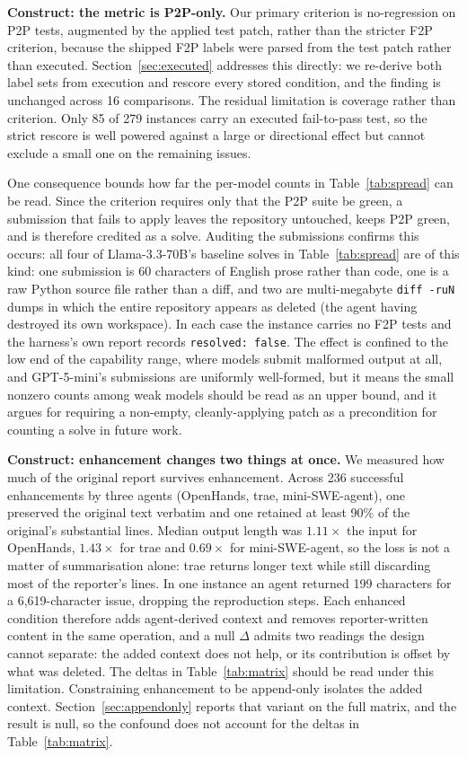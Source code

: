 \documentclass[journal]{IEEEtran}
\begin{document}
\textbf{Construct: the metric is P2P-only.} Our primary criterion is no-regression on P2P tests, augmented by the applied test patch, rather than the stricter F2P criterion, because the shipped F2P labels were parsed from the test patch rather than executed. Section~\ref{sec:executed} addresses this directly: we re-derive both label sets from execution and rescore every stored condition, and the finding is unchanged across 16 comparisons. The residual limitation is coverage rather than criterion. Only 85 of 279 instances carry an executed fail-to-pass test, so the strict rescore is well powered against a large or directional effect but cannot exclude a small one on the remaining issues.

One consequence bounds how far the per-model counts in Table~\ref{tab:spread} can be read. Since the criterion requires only that the P2P suite be green, a submission that fails to apply leaves the repository untouched, keeps P2P green, and is therefore credited as a solve. Auditing the submissions confirms this occurs: all four of Llama-3.3-70B's baseline solves in Table~\ref{tab:spread} are of this kind: one submission is 60 characters of English prose rather than code, one is a raw Python source file rather than a diff, and two are multi-megabyte \texttt{diff -ruN} dumps in which the entire repository appears as deleted (the agent having destroyed its own workspace). In each case the instance carries no F2P tests and the harness's own report records \texttt{resolved: false}. The effect is confined to the low end of the capability range, where models submit malformed output at all, and GPT-5-mini's submissions are uniformly well-formed, but it means the small nonzero counts among weak models should be read as an upper bound, and it argues for requiring a non-empty, cleanly-applying patch as a precondition for counting a solve in future work.

\textbf{Construct: enhancement changes two things at once.} We measured how much of the original report survives enhancement. Across 236 successful enhancements by three agents (OpenHands, trae, mini-SWE-agent), one preserved the original text verbatim and one retained at least 90\% of the original's substantial lines. Median output length was $1.11\times$ the input for OpenHands, $1.43\times$ for trae and $0.69\times$ for mini-SWE-agent, so the loss is not a matter of summarisation alone: trae returns longer text while still discarding most of the reporter's lines. In one instance an agent returned 199 characters for a 6,619-character issue, dropping the reproduction steps. Each enhanced condition therefore adds agent-derived context and removes reporter-written content in the same operation, and a null $\Delta$ admits two readings the design cannot separate: the added context does not help, or its contribution is offset by what was deleted. The deltas in Table~\ref{tab:matrix} should be read under this limitation. Constraining enhancement to be append-only isolates the added context. Section~\ref{sec:appendonly} reports that variant on the full matrix, and the result is null, so the confound does not account for the deltas in Table~\ref{tab:matrix}.
\end{document}
